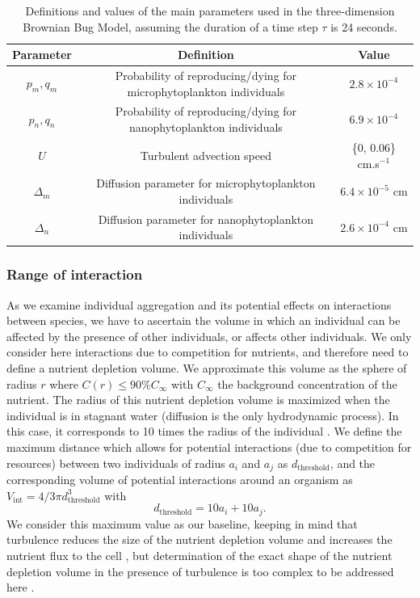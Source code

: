 \documentclass[english]{article}
\providecommand{\tabularnewline}{\\}
\begin{document}
\begin{table}[H]
\begin{centering}
\begin{tabular}{|c|c|c|}
\hline 
Parameter & Definition & Value\tabularnewline
\hline 
$p_{m},q_{m}$ & Probability of reproducing/dying for microphytoplankton individuals & $2.8\times10^{-4}$\tabularnewline
$p_{n},q_{n}$ & Probability of reproducing/dying for nanophytoplankton individuals & $6.9\times10^{-4}$\tabularnewline
$U$ & Turbulent advection speed & \{0, 0.06\} cm.s$^{-1}$\tabularnewline
$\Delta_{m}$ & Diffusion parameter for microphytoplankton individuals & $6.4\times10^{-5}$ cm\tabularnewline
$\Delta_{n}$ & Diffusion parameter for nanophytoplankton individuals & $2.6\times10^{-4}$ cm\tabularnewline
\hline 
\end{tabular}
\par\end{centering}
\caption{Definitions and values of the main parameters used in the three-dimension
Brownian Bug Model, assuming the duration of a time step $\tau$ is
24 seconds. \label{tab:Definition-and-value}}
\end{table}


\subsubsection*{Range of interaction}

As we examine individual aggregation and its potential effects on
interactions between species, we have to ascertain the volume in which
an individual can be affected by the presence of other individuals,
or affects other individuals. We only consider here interactions due
to competition for nutrients, and therefore need to define a nutrient
depletion volume. We approximate this volume as the sphere of radius
$r$ where $C(r)\leq90\%C_{\infty}$ with $C_{\infty}$ the background
concentration of the nutrient. The radius of this nutrient depletion
volume is maximized when the individual is in stagnant water (diffusion
is the only hydrodynamic process). In this case, it corresponds to
10 times the radius of the individual \citep{jumars_physical_1993,karp-boss_nutrient_1996}.
We define the maximum distance which allows for potential interactions
(due to competition for resources) between two individuals of radius
$a_{i}$ and $a_{j}$ as $d_{\text{threshold}}$, and the corresponding
volume of potential interactions around an organism as $V_{\text{int}}=4/3\pi d_{\text{threshold}}^{3}$
with
\begin{equation}
d_{\text{threshold}}=10a_{i}+10a_{j}.\label{eq:distance_interaction}
\end{equation}
We consider this maximum value as our baseline, keeping in mind that
turbulence reduces the size of the nutrient depletion volume and increases
the nutrient flux to the cell \citep{arnott_artificially_2021}, but
determination of the exact shape of the nutrient depletion volume
in the presence of turbulence is too complex to be addressed here \citep{karp-boss_nutrient_1996}.
\end{document}
